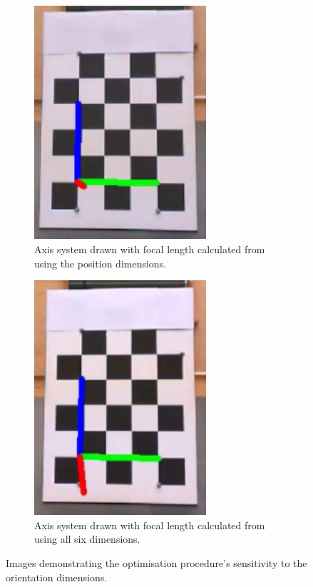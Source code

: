\begin{figure}
  \begin{subfigure}[t]{0.48\textwidth}
    \centering
    \includegraphics[width=0.7\textwidth]{figures/chapter3/3_dim_optimisation}
    \caption{Axis system drawn with focal length calculated from using the position dimensions.}
  \end{subfigure}
  \begin{subfigure}[t]{0.48\textwidth}
    \centering
    \includegraphics[width=0.7\textwidth]{figures/chapter3/6_dim_optimisation}
    \caption{Axis system drawn with focal length calculated from using all six dimensions.}
  \end{subfigure}
  \caption{Images demonstrating the optimisation procedure's sensitivity to the orientation dimensions.}
  \label{fig:chap3-bad-optimisation}
\end{figure}

